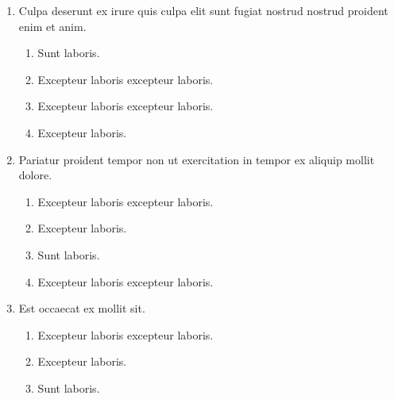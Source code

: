 \documentclass[a4paper,12pt]{article}
\begin{document}
\begin{enumerate}[label=\textbf{\arabic*.}]
\begin{multicols}{2}
\begin{enumerate}
		\item  Excepteur laboris.
    
		\item  Sunt laboris.
    
	\end{enumerate}

\end{multicols}
\item Culpa deserunt ex irure quis culpa elit sunt fugiat nostrud nostrud proident enim et anim.
\begin{multicols}{2}
	\begin{enumerate}
		\item  Sunt laboris.
    
		\item  Excepteur laboris excepteur laboris.
    
		\item  Excepteur laboris excepteur laboris.
  
		\item  Excepteur laboris.
    
	\end{enumerate}

\end{multicols}
\item Pariatur proident tempor non ut exercitation in tempor ex aliquip mollit dolore.
\begin{multicols}{2}
	\begin{enumerate}
		\item  Excepteur laboris excepteur laboris.
    
		\item  Excepteur laboris.
    
		\item  Sunt laboris.
    
		\item  Excepteur laboris excepteur laboris.
  
	\end{enumerate}

\end{multicols}
\item Est occaecat ex mollit sit.
\begin{multicols}{2}
	\begin{enumerate}
		\item  Excepteur laboris excepteur laboris.
  
		\item  Excepteur laboris.
    
		\item  Sunt laboris.
    

\end{enumerate}
\end{multicols}
\end{enumerate}
\end{document}

